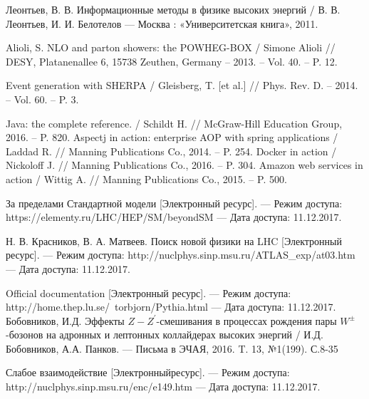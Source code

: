 

	Леонтьев, В. В. 
	Информационные методы в физике высоких энергий 
	/ В. В. Леонтьев, И. И. Белотелов 
	— Москва : «Университетская книга», 2011.

	Alioli, S. NLO and parton showers: the POWHEG-BOX
	/ Simone Alioli 
	// DESY, Platanenallee 6, 15738 Zeuthen, Germany – 2013. – Vol. 40. – P. 12.

	Event generation with SHERPA
	/ Gleisberg, T. [et al.]  
	// Phys. Rev. D. – 2014. – Vol. 60. – P. 3.

	Java: the complete reference. 
	/ Schildt H. 
	// McGraw-Hill Education Group, 2016. – P. 820.
	Aspectj in action: enterprise AOP with spring applications
	/ Laddad R. 
	// Manning Publications Co., 2014. – P. 254.
	Docker in action
	/ Nickoloff J.
	// Manning Publications Co., 2016. – P. 304.
	Amazon web services in action
	/ Wittig A.
	// Manning Publications Co., 2015. – P. 500.

	За пределами Стандартной модели
	[Электронный ресурс].
	 — Режим доступа: https://elementy.ru/LHC/HEP/SM/beyondSM 
	 — Да­та доступа: 11.12.2017.


	Н. В. Красников, В. А. 
	Матвеев. Поиск новой физики на LHC
	[Электронный ресурс].
	 — Режим доступа: http://nuclphys.sinp.msu.ru/ATLAS\_exp/at03.htm 
	 — Дата доступа: 11.12.2017.
	 
	 Official documentation
	 [Электронный ресурс].
	 — Режим доступа: http://home.thep.lu.se/~torbjorn/Pythia.html 
	 — Дата доступа: 11.12.2017.
	Бобовников, И.Д. Эффекты $Z-Z^\prime$-смешивания в процессах рождения пары $W^±$-бозонов на адронных и лептонных коллайдерах высоких энергий
	/ И.Д. Бобовников, А.А. Панков.
	— Письма в ЭЧАЯ, 2016. T. 13, №1(199). С.8-35
	
	Слабое взаимодействие 
	[Электронныйресурс].
	— Режим доступа: http://nuclphys.sinp.msu.ru/enc/e149.htm
	— Дата доступа: 11.12.2017.

	 
